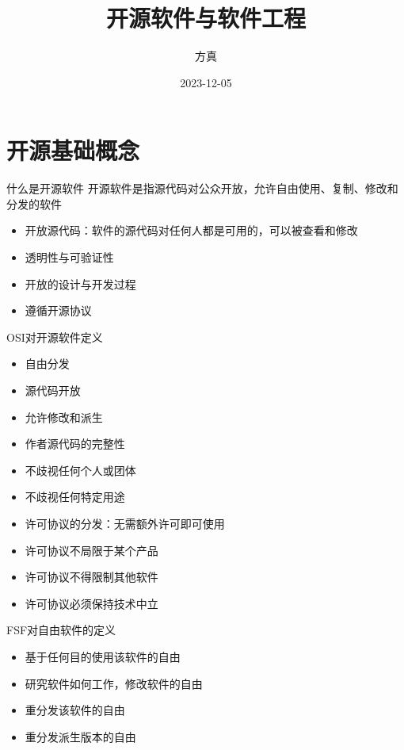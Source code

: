 \documentclass{beamer}
\author{方真}
\date{2023-12-05}
\title{开源软件与软件工程}
\begin{document}
\maketitle

\section{开源基础概念}
\label{sec:org2f5f59c}
\begin{frame}[label={sec:org4c16e6a}]{什么是开源软件}
开源软件是指源代码对公众开放，允许自由使用、复制、修改和分发的软件
\begin{itemize}
\item 开放源代码：软件的源代码对任何人都是可用的，可以被查看和修改
\item 透明性与可验证性
\item 开放的设计与开发过程
\item 遵循开源协议
\end{itemize}
\end{frame}
\begin{frame}[label={sec:orga97a4b0}]{OSI对开源软件定义}
\begin{itemize}
\item 自由分发
\item 源代码开放
\item 允许修改和派生
\item 作者源代码的完整性
\item 不歧视任何个人或团体
\item 不歧视任何特定用途
\item 许可协议的分发：无需额外许可即可使用
\item 许可协议不局限于某个产品
\item 许可协议不得限制其他软件
\item 许可协议必须保持技术中立
\end{itemize}
\end{frame}
\begin{frame}[label={sec:org57c58ce}]{FSF对自由软件的定义}
\begin{itemize}
\item 基于任何目的使用该软件的自由
\item 研究软件如何工作，修改软件的自由
\item 重分发该软件的自由
\item 重分发派生版本的自由
\end{itemize}
\end{frame}
\end{document}
